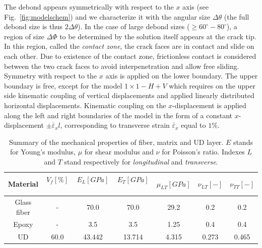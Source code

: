 \documentclass[review]{elsarticle}
\begin{document}
The debond appears symmetrically with respect to the $x$ axis (see Fig.~\ref{fig:modelschem}) and we characterize it with the angular size $\Delta\theta$ (the full debond size is thus $2\Delta\theta$). In the case of large debond sizes ($\geq 60^{\circ}-80^{\circ}$), a region of size $\Delta\Phi$ to be determined by the solution itself appears at the crack tip. In this region, called the \emph{contact zone}, the crack faces are in contact and slide on each other. Due to existence of the contact zone, frictionless contact is considered between the two crack faces to avoid interpenetration and allow free sliding. Symmetry with respect to the $x$ axis is applied on the lower boundary. The upper boundary is free, except for the model $1\times 1-H+V$ which requires on the upper side kinematic coupling of vertical displacements and applied linearly distributed horizontal displacements. Kinematic coupling on the $x$-displacement is applied along the left and right boundaries of the model in the form of a constant $x$-displacement $\pm\bar{\varepsilon}_{x} l$, corresponding to transverse strain $\bar{\varepsilon}_{x}$ equal to $1\%$.

\begin{table}[!htbp]
 \centering
 \caption{Summary of the mechanical properties of fiber, matrix and UD layer. $E$ stands for Young's modulus, $\mu$ for shear modulus and $\nu$ for Poisson's ratio. Indexes $L$ and $T$ stand respectively for \emph{longitudinal} and \emph{transverse}.}
 \begin{tabular}{ccccccc}
\textbf{Material} & \textbf{$V_{f}\left[\%\right]$}\  & \textbf{$E_{L}\left[GPa\right]$}\ & \textbf{$E_{T}\left[GPa\right]$}\  & \textbf{$\mu_{LT}\left[GPa\right]$} &\textbf{$\nu_{LT}\left[-\right]$} & \textbf{$\nu_{TT}\left[-\right]$} \\
\midrule
Glass fiber &-   & 70.0 & 70.0  & 29.2 & 0.2  & 0.2\\
Epoxy    &-& 3.5 & 3.5   & 1.25 &  0.4& 0.4\\
UD&60.0&43.442&13.714& 4.315& 0.273&0.465\\
\end{tabular}
\label{tab:phaseprop}
\end{table}
\end{document}
